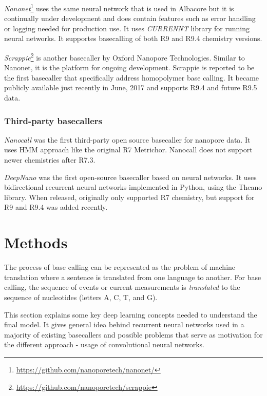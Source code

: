 \documentclass[times, utf8, diplomski, numeric, english]{fer}
\begin{document}
\textit{Nanonet}\footnote{\url{https://github.com/nanoporetech/nanonet/}} uses the same neural network that is used in Albacore but it is continually under development and does contain features such as error handling or logging needed for production use. It uses \textit{CURRENNT} library for running neural networks. It supportes basecalling of both R9 and R9.4 chemistry versions.


\textit{Scrappie}\footnote{\url{https://github.com/nanoporetech/scrappie}} is another basecaller by Oxford Nanopore Technologies. Similar to Nanonet, it is the platform for ongoing development. Scrappie is reported to be the first basecaller  that specifically address homopolymer base calling. It became publicly available just recently in June, 2017 and supports R9.4 and future R9.5 data.

\pagebreak
\subsection{Third-party basecallers}

\textit{Nanocall}\cite{David046086} was the first third-party open source basecaller for nanopore data. It uses HMM approach like the original R7 Metrichor. Nanocall does not support newer chemistries after R7.3.


\textit{DeepNano}\cite{Boza2017}  was the first open-source basecaller based on neural networks. It uses bidirectional recurrent neural networks implemented in Python, using the Theano library. When released, originally only supported R7 chemistry, but support for R9 and R9.4 was added recently.



\chapter{Methods}
The process of base calling can be represented as the problem of machine translation where a sentence is translated from one language to another. For base calling, the sequence of events or current measurements is \textit{translated} to the sequence of nucleotides (letters A, C, T, and G).

This section explains some key  deep learning concepts needed to understand the final model. It gives general idea behind recurrent neural networks used in a majority of existing basecallers and possible problems that serve as motivation for the different approach - usage of convolutional neural networks. 
\end{document}
